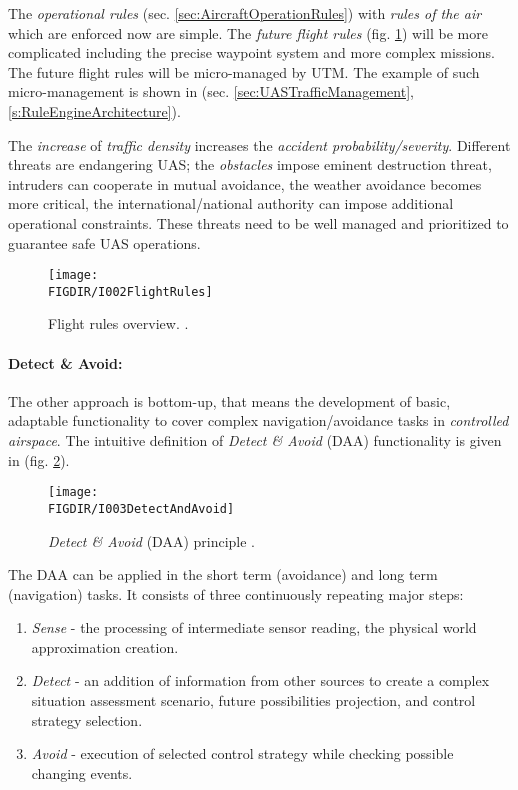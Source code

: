 The \emph{operational rules} (sec. \ref{sec:AircraftOperationRules}) with \emph{rules of the air} \cite{icaoAnnex2} which are enforced now are simple. The \emph{future flight rules} (fig. \ref{fig:flightRulesIntro}) will be more complicated including the precise waypoint system and more complex missions. The future flight rules will be micro-managed by UTM. The example of such micro-management is shown in (sec. \ref{sec:UASTrafficManagement}, \ref{s:RuleEngineArchitecture}). 

The \emph{increase} of \emph{traffic density} increases the \emph{accident probability/severity}.  Different threats are endangering UAS; the \emph{obstacles} impose eminent destruction threat, intruders can cooperate in mutual avoidance, the weather avoidance becomes more critical, the international/national authority can impose additional operational constraints. These threats need to be well managed and prioritized to guarantee safe UAS operations.

\begin{figure}[H]
    \centering
    \texttt{[image: \\FIGDIR/I002FlightRules]}
    \caption{Flight rules overview. \cite{airbusUTM2018blueprint}.}
    \label{fig:flightRulesIntro}
\end{figure}

\paragraph{Detect \& Avoid:} The other approach is bottom-up, that means the development of basic, adaptable functionality to cover complex navigation/avoidance tasks in \emph{controlled airspace}. The intuitive definition of \emph{Detect \& Avoid} (DAA) functionality is given in (fig. \ref{fig:detectAdnAvoidIntroduction}).

\begin{figure}[H]
    \centering
    \texttt{[image: \\FIGDIR/I003DetectAndAvoid]}
    \caption{\emph{Detect \& Avoid} (DAA) principle \cite{jenie2014velocity}.}
    \label{fig:detectAdnAvoidIntroduction}
\end{figure}

\noindent The DAA can be applied in the short term (avoidance) and long term (navigation) tasks. It consists of three continuously repeating major steps:
\begin{enumerate}
    \item \emph{Sense} - the processing of intermediate sensor reading, the physical world approximation creation.
    
    \item \emph{Detect} - an addition of information from other sources to create a complex situation assessment scenario, future possibilities projection, and control strategy selection.
    
    \item \emph{Avoid} - execution of selected control strategy while checking possible changing events.
\end{enumerate}


